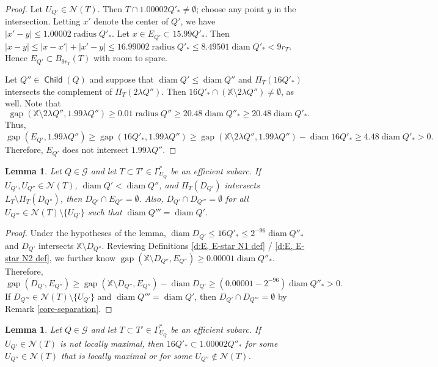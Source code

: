 \documentclass[12pt]{amsart}
\numberwithin{equation}{section}
\theoremstyle{plain}
\newtheorem{lemma}[theorem]{Lemma}
\theoremstyle{definition}
\def\XX{{\mathbb{X}}}
\newcommand{\radius}{\mathop\mathrm{radius}\nolimits}
\newcommand{\diam}{\mathop\mathrm{diam}\nolimits}
\newcommand{\Child}{\mathop\mathsf{Child}\nolimits}
\newcommand{\gap}{\mathop\mathrm{gap}\nolimits}
\numberwithin{figure}{section}
\begin{document}
\begin{proof} Let $U_{Q'}\in\mathcal{N}(T)$. Then $T\cap 1.00002Q'_*\neq\emptyset$; choose any point $y$ in the intersection. Letting $x'$ denote the center of $Q'$, we have $|x'-y|\leq 1.00002\radius Q'_*$. Let $x\in E_{Q'}\subset 15.99Q'_*$. Then $|x-y|\leq |x-x'|+|x'-y| \leq 16.99002\radius Q'_*\leq 8.49501\diam Q'_*<9r_T$. Hence $E_{Q'}\subset B_{9r_T}(T)$ with room to spare.

Let $Q''\in\Child(Q)$ and suppose that $\diam Q'\leq \diam Q''$ and $\Pi_T(16Q'_*)$ intersects the complement of $\Pi_T(2\lambda Q'')$. Then $16Q'_*\cap(\XX\setminus 2\lambda Q'')\neq\emptyset$, as well. Note that $$\gap(\XX\setminus 2\lambda Q'',1.99\lambda Q'') \geq 0.01\radius Q''\geq 20.48\diam Q''_*\geq 20.48\diam Q'_*.$$ Thus, $\gap(E_{Q'},1.99\lambda Q'')\geq \gap(16Q'_*,1.99\lambda Q'')\geq \gap(\XX\setminus 2\lambda Q'',1.99\lambda Q'')-\diam 16Q'_*\geq 4.48\diam Q'_*>0.$ Therefore, $E_{Q'}$ does not intersect $1.99\lambda Q''$.
\end{proof}

\begin{lemma}\label{disjoint-E's} Let $Q\in\mathscr{G}$ and let $T\subset T'\in\Gamma^*_{U_Q}$ be an efficient subarc. If $U_{Q'},U_{Q''}\in\mathcal{N}(T)$, $\diam Q'<\diam Q''$, and $\Pi_T(D_{Q'})$ intersects $L_T\setminus\Pi_T(D_{Q''})$, then $D_{Q'}\cap E_{Q''}=\emptyset$. Also, $D_{Q'}\cap D_{Q'''}=\emptyset$ for all $U_{Q'''}\in\mathcal{N}(T)\setminus\{U_{Q'}\}$ such that $\diam Q'''=\diam Q'$.\end{lemma}

\begin{proof} Under the hypotheses of the lemma, $\diam D_{Q'}\leq 16 Q'_*\leq 2^{-96}\diam Q''_*$ and $D_{Q'}$ intersects $\XX\setminus D_{Q''}$. Reviewing Definitions \ref{d:E, E-star N1 def} / \ref{d:E, E-star N2 def}, we further know $\gap(\XX\setminus D_{Q''},E_{Q''})\geq 0.00001\diam Q''_*$. Therefore, \begin{equation*}\gap(D_{Q'},E_{Q''})\geq \gap(\XX\setminus D_{Q''},E_{Q''})-\diam D_{Q'}\geq (0.00001-2^{-96})\diam Q''_*>0.\end{equation*} If $D_{Q'''}\in\mathcal{N}(T)\setminus\{U_{Q'}\}$ and $\diam Q'''=\diam Q'$, then $D_{Q'}\cap D_{Q'''}=\emptyset$ by Remark \ref{core-separation}.
\end{proof}

\begin{lemma}\label{not-locally-maximal-are-contained} Let $Q\in\mathscr{G}$ and let $T\subset T'\in\Gamma^*_{U_Q}$ be an efficient subarc. If  $U_{Q'}\in\mathcal{N}(T)$ is not locally maximal, then $16Q'_*\subset 1.00002Q''_*$ for some $U_{Q''}\in\mathcal{N}(T)$ that is locally maximal or for some $U_{Q''}\not\in\mathcal{N}(T)$.\end{lemma}
\end{document}
